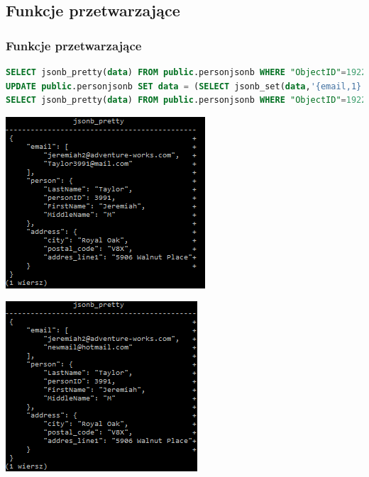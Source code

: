 \documentclass{beamer}
\begin{document}
\subsection{Funkcje przetwarzające}
\begin{frame}[fragile]
\frametitle{Funkcje przetwarzające}
\begin{lstlisting}[language=SQL,basicstyle=\tiny]
SELECT jsonb_pretty(data) FROM public.personjsonb WHERE "ObjectID"=1922;
UPDATE public.personjsonb SET data = (SELECT jsonb_set(data,'{email,1}','"newmail@hotmail.com"',false) FROM public.personjsonb WHERE "ObjectID"=1922) WHERE "ObjectID"=1922;
SELECT jsonb_pretty(data) FROM public.personjsonb WHERE "ObjectID"=1922;
\end{lstlisting}
\vspace{0.65cm}
\begin{minipage}{0.49\textwidth}
\makeatletter
\def\@captype{figure}
\makeatother
\begin{center}
\includegraphics[scale=0.7]{sc/36}
\caption{Przed modyfikacją}
\end{center}

\end{minipage}
\begin{minipage}{0.4\textwidth}
\makeatletter
\def\@captype{figure}
\makeatother
\begin{center}
\includegraphics[scale=0.7]{sc/37}
\caption{Po modyfikacji}
\end{center}
\end{minipage}
\end{frame}
\end{document}
